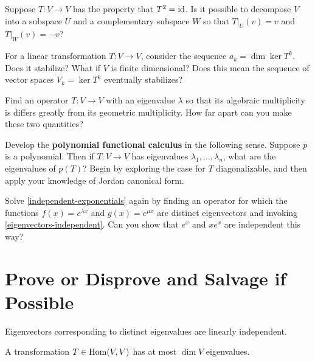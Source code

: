 \documentclass{homework}
\begin{document}
\begin{problem}
  Suppose $T : V \to V$ has the property that $T^2 = \operatorname{id}$.  Is it possible to decompose
  $V$ into a subspace $U$ and a complementary subspace $W$ so that
  $T |_U(v) = v$ and $T |_W(v) = -v$?
\end{problem}

\begin{problem}
  For a linear transformation $T : V \to V$, consider the sequence
  $a_k = \dim \ker T^k$.  Does it stabilize?  What if $V$ is finite
  dimensional?  Does this mean the sequence of vector
  spaces $V_k = \ker T^k$ eventually stabilizes?
\end{problem}

\begin{problem}
  Find an operator $T : V \to V$ with an eigenvalue $\lambda$ so that
  its algebraic multiplicity is differs greatly from its geometric
  multiplicity.  How far apart can you make these two quantities?
\end{problem}

\begin{problem}
  Develop the \textbf{polynomial functional calculus} in the following sense.  Suppose $p$ is a polynomial.  Then if $T : V \to V$ has eigenvalues $\lambda_1, \ldots, \lambda_n$, what are the eigenvalues of $p(T)$?  Begin by exploring the case for $T$ diagonalizable, and then apply your knowledge of Jordan canonical form.
\end{problem}

\begin{problem}
  Solve \ref{independent-exponentials} again by finding an operator for which the functions $f(x) = e^{\lambda x}$ and $g(x) = e^{\mu x}$ are distinct eigenvectors and invoking \ref{eigenvectors-independent}.  Can you show that $e^x$ and $xe^x$ are independent this way?
\end{problem}

\section{Prove or Disprove and Salvage if Possible}

\begin{problem}\label{eigenvectors-independent}
  Eigenvectors corresponding to distinct eigenvalues are linearly independent.
\end{problem}

\begin{problem}
  A transformation $T \in \operatorname{Hom}(V,V)$ has at most $\dim V$ eigenvalues.
\end{problem}
\end{document}
